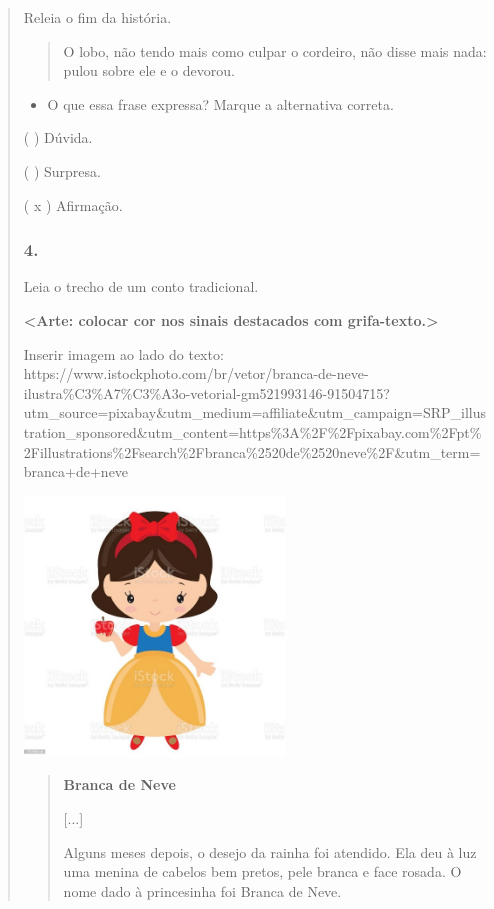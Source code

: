 \begin{quote}
\begin{iteize}
Releia o fim da história.

\begin{quote}
O lobo, não tendo mais como culpar o cordeiro, não disse mais nada:
pulou sobre ele e o devorou.
\end{quote}

\begin{itemize}
\item
  O que essa frase expressa? Marque a alternativa correta.
\end{itemize}

( ) Dúvida.

( ) Surpresa.

( x ) Afirmação.

\subsubsection{4. }\label{section-35}

Leia o trecho de um conto tradicional.

\textbf{\textless{}Arte: colocar cor nos sinais destacados com
grifa-texto.\textgreater{}}

Inserir imagem ao lado do texto:
https://www.istockphoto.com/br/vetor/branca-de-neve-ilustra\%C3\%A7\%C3\%A3o-vetorial-gm521993146-91504715?utm\_source=pixabay\&utm\_medium=affiliate\&utm\_campaign=SRP\_illustration\_sponsored\&utm\_content=https\%3A\%2F\%2Fpixabay.com\%2Fpt\%2Fillustrations\%2Fsearch\%2Fbranca\%2520de\%2520neve\%2F\&utm\_term=branca+de+neve

\includegraphics[width=2.71875in,height=2.71875in]{media/image6.jpeg}

\begin{quote}
\textbf{Branca de Neve}

{[}...{]}

Alguns meses depois, o desejo da rainha foi atendido. Ela deu à luz uma
menina de cabelos bem pretos, pele branca e face rosada. O nome dado à
princesinha foi Branca de Neve.


\end{quote}
\end{iteize}
\end{quote}
